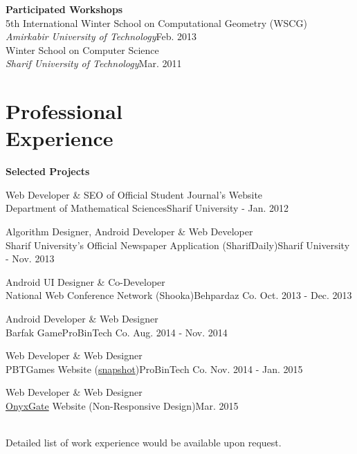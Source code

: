 \documentclass[margin,line]{resume}
\begin{document}
\begin{resume}
      
     {\bf Participated Workshops}\vspace{1mm}\\
      5th International Winter School on Computational Geometry (WSCG)\\
      {\sl Amirkabir University of Technology}\hfill {\sf Feb. 2013\vspace{1mm}}\\
      Winter School on Computer Science\\
      {\sl Sharif University of Technology}\hfill {\sf Mar. 2011}
    
    \section{\mysidestyle Professional\\Experience}
    {\bf Selected Projects}
    \begin{list2}
        \vspace*{1mm}
        \item Web Developer \& SEO of Official Student Journal's Website \\
        Department of Mathematical Sciences\hfill{\sf Sharif University - Jan. 2012}
        \item Algorithm Designer, Android Developer \& Web Developer\\
        Sharif University's Official Newspaper Application (SharifDaily)\hfill{\sf Sharif University - Nov. 2013}
        \item Android UI Designer \& Co-Developer\\
        National Web Conference Network (Shooka)\hfill{\sf Behpardaz Co. Oct. 2013 - Dec. 2013}
        \item Android Developer \& Web Designer\\
        Barfak Game\hfill{\sf ProBinTech Co. Aug. 2014 - Nov. 2014}
        \item Web Developer \& Web Designer\\
        PBTGames Website (\href{http://mmbrian.webfactional.com}{snapshot})\hfill{\sf ProBinTech Co. Nov. 2014 - Jan. 2015}
        \item Web Developer \& Web Designer\\
        \href{http://onyxgate.com/}{OnyxGate} Website (Non-Responsive Design)\hfill{\sf Mar. 2015}
    \end{list2}\hfill\\
    Detailed list of work experience would be available upon request.\hfill\\
    

\end{resume}
\end{document}
